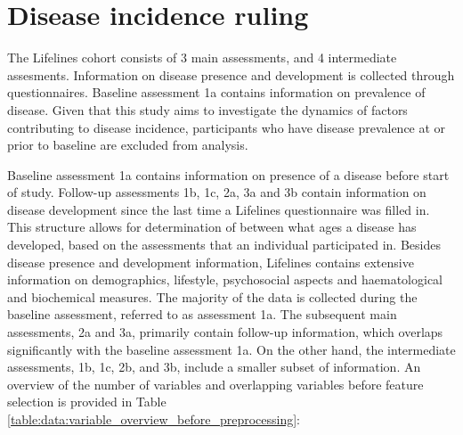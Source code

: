 \section{Disease incidence ruling}
\label{section:data:disease_incidence_ruling}
The Lifelines cohort consists of 3 main assessments, and 4 intermediate assesments. Information on disease presence and development is collected through questionnaires. Baseline assessment 1a contains information on prevalence of disease. Given that this study aims to investigate the dynamics of factors contributing to disease incidence, participants who have disease prevalence at or prior to baseline are excluded from analysis. 

Baseline assessment 1a contains information on presence of a disease before start of study. Follow-up assessments 1b, 1c, 2a, 3a and 3b contain information on disease development since the last time a Lifelines questionnaire was filled in. This structure allows for determination of between what ages a disease has developed, based on the assessments that an individual participated in. Besides disease presence and development information, Lifelines contains extensive information on demographics, lifestyle, psychosocial aspects and haematological and biochemical measures.  The majority of the data is collected during the baseline assessment, referred to as assessment 1a. The subsequent main assessments, 2a and 3a, primarily contain follow-up information, which overlaps significantly with the baseline assessment 1a. On the other hand, the intermediate assessments, 1b, 1c, 2b, and 3b, include a smaller subset of information. An overview of the number of variables and overlapping variables before feature selection is provided in Table \ref{table:data:variable_overview_before_preprocessing}: 

